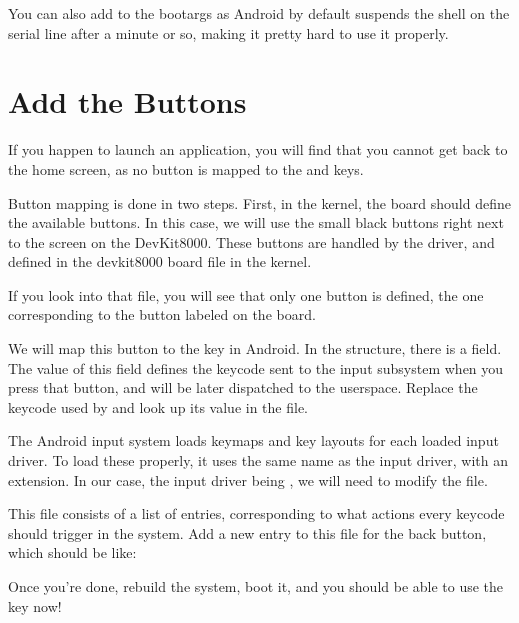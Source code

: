 You can also add  to the bootargs as Android
by default suspends the shell on the serial line after a minute or so,
making it pretty hard to use it properly.

\section{Add the Buttons}

If you happen to launch an application, you will find that you cannot
get back to the home screen, as no button is mapped to the 
and  keys.

Button mapping is done in two steps. First, in the kernel, the board
should define the available buttons. In this case, we will use the
small black buttons right next to the screen on the DevKit8000. These
buttons are handled by the  driver, and defined in the
devkit8000 board file in the kernel.

If you look into that file, you will see that only one button is
defined, the one corresponding to the button labeled 
on the board.

We will map this button to the  key in Android. In the
 structure, there is a  field. The
value of this field defines the keycode sent to the input subsystem
when you press that button, and will be later dispatched to the
userspace. Replace the keycode used by  and look up its
value in the  file.

The Android input system loads keymaps and key layouts for each loaded
input driver. To load these properly, it uses the same name as the
input driver, with an extension. In our case, the input driver being
, we will need to modify the  file.

This file consists of a list of entries, corresponding to what actions
every keycode should trigger in the system. Add a new entry to this
file for the back button, which should be like:

Once you're done, rebuild the system, boot it, and you should be able
to use the  key now!
